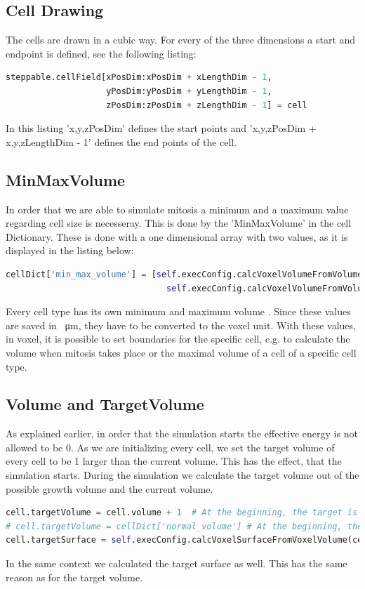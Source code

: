 \subsection{Cell Drawing}
The cells are drawn in a cubic way. For every of the three dimensions a start and endpoint is defined, see the following listing:
\begin{lstlisting}[language=Python, caption = cell Draw]
steppable.cellField[xPosDim:xPosDim + xLengthDim - 1,
					yPosDim:yPosDim + yLengthDim - 1,
					zPosDim:zPosDim + zLengthDim - 1] = cell
\end{lstlisting}
In this listing 'x,y,zPosDim' defines the start points and 'x,y,zPosDim + x,y,zLengthDim - 1' defines the end points of the cell. 

\subsection{MinMaxVolume}
In order that we are able to simulate mitosis a minimum and a maximum value regarding cell size is necesseray. This is done by the 'MinMaxVolume' in the cell Dictionary. These is done with a one dimensional array with two values, as it is displayed in the listing below:
\begin{lstlisting}[language=Python, caption = MinMaxVolume]
cellDict['min_max_volume'] = [self.execConfig.calcVoxelVolumeFromVolume(cellType.minVol),
								self.execConfig.calcVoxelVolumeFromVolume(cellType.maxVol)]
\end{lstlisting} 
Every cell type has its own minimum and maximum volume \cite{Torelli2017}. Since these values are saved in \SI{}{\micro\metre}, they have to be converted to the voxel unit. With these values, in voxel, it is possible to set boundaries for the specific cell, e.g. to calculate the volume when mitosis takes place or the maximal volume of a cell of a specific cell type.
\subsection{Volume and TargetVolume}
As explained earlier, in order that the simulation starts the effective energy is not allowed to be 0. As we are initializing every cell, we set the target volume of every cell to be 1 larger than the current volume. This has the effect, that the simulation starts. During the simulation we calculate the target volume out of the possible growth volume and the current volume.
\begin{lstlisting}[language=Python, caption = set target Volume and Surface of a cell]
cell.targetVolume = cell.volume + 1  # At the beginning, the target is the actual size.
# cell.targetVolume = cellDict['normal_volume'] # At the beginning, the target is the actual size.
cell.targetSurface = self.execConfig.calcVoxelSurfaceFromVoxelVolume(cell.targetVolume)
\end{lstlisting}
In the same context we calculated the target surface as well. This has the same reason as for the target volume. 

